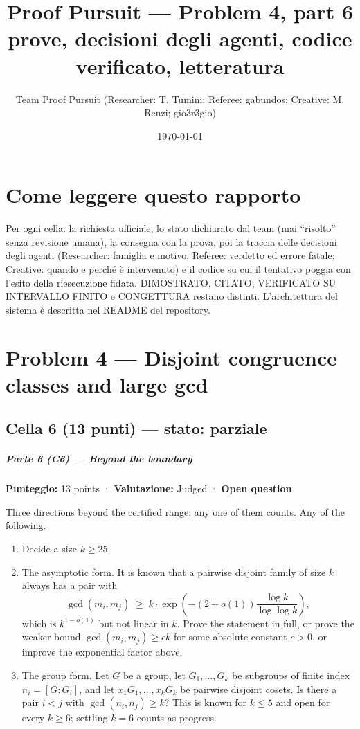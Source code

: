 \documentclass[11pt,a4paper]{article}
\title{Proof Pursuit --- Problem 4, part 6\\ \large prove, decisioni degli agenti, codice verificato, letteratura}
\author{Team Proof Pursuit (Researcher: T. Tumini; Referee: gabundos; Creative: M. Renzi; gio3r3gio)}
\date{\today}
\begin{document}
\maketitle\tableofcontents
\section*{Come leggere questo rapporto}
Per ogni cella: la richiesta ufficiale, lo stato dichiarato dal team (mai ``risolto'' senza revisione umana), la consegna
con la prova, poi la traccia delle decisioni degli agenti (Researcher: famiglia e motivo; Referee: verdetto ed errore
fatale; Creative: quando e perché è intervenuto) e il codice su cui il tentativo poggia con l'esito della riesecuzione
fidata. DIMOSTRATO, CITATO, VERIFICATO SU INTERVALLO FINITO e CONGETTURA restano distinti. L'architettura del sistema
è descritta nel README del repository.
\section{Problem 4 — Disjoint congruence classes and large gcd}
\subsection{Cella 6 (13 punti) — stato: parziale}
\subparagraph{Parte 6 (C6) --- Beyond the
boundary}\label{parte-6-c6-beyond-the-boundary}

\textbf{Punteggio:} 13 points · \textbf{Valutazione:} Judged ·
\textbf{Open question}

Three directions beyond the certified range; any one of them counts. Any
of the following.

\begin{enumerate}
\def\labelenumi{(\alph{enumi})}
\item
  Decide a size \(k \ge 25\).
\item
  The asymptotic form. It is known that a pairwise disjoint family of
  size \(k\) always has a pair with \[
  \gcd(m_i, m_j) \;\ge\; k \cdot \exp\!\left( -(2 + o(1)) \frac{\log k}{\log\log k} \right),
  \] which is \(k^{1 - o(1)}\) but not linear in \(k\). Prove the
  statement in full, or prove the weaker bound \(\gcd(m_i, m_j) \ge ck\)
  for some absolute constant \(c > 0\), or improve the exponential
  factor above.
\item
  The group form. Let \(G\) be a group, let \(G_1, \ldots, G_k\) be
  subgroups of finite index \(n_i = [G : G_i]\), and let
  \(x_1 G_1, \ldots, x_k G_k\) be pairwise disjoint cosets. Is there a
  pair \(i < j\) with \(\gcd(n_i, n_j) \ge k\)? This is known for
  \(k \le 5\) and open for every \(k \ge 6\); settling \(k = 6\) counts
  as progress.
\end{enumerate}
\end{document}
